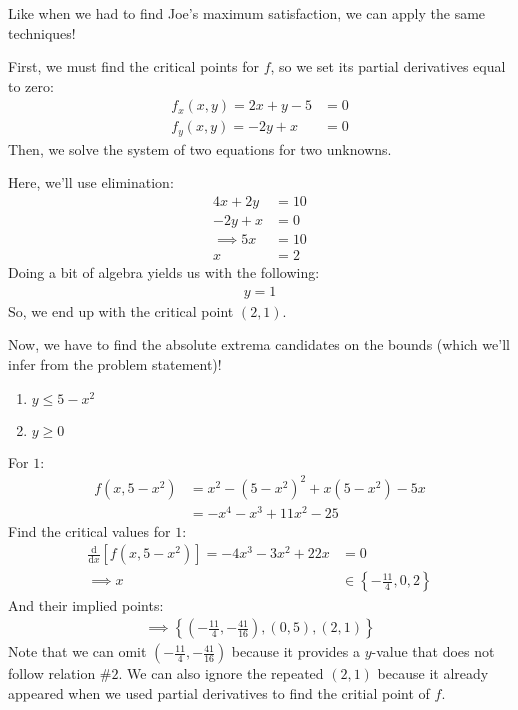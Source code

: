 Like when we had to find Joe's maximum satisfaction, we can apply the same techniques!

First, we must find the critical points for $f$, so we set its partial derivatives equal to zero:
\begin{align*}
	f_x(x,y)=2x+y-5&=0\\
	f_y(x,y)=-2y+x&=0
\end{align*}
Then, we solve the system of two equations for two unknowns.

Here, we'll use elimination:
\begin{align*}
	4x+2y&=10\\
	-2y+x&=0\\
	\implies 5x&=10\\
	x&=2
\end{align*}
Doing a bit of algebra yields us with the following:
\begin{align*}
	y=1
\end{align*}
So, we end up with the critical point $(2, 1)$.

Now, we have to find the absolute extrema candidates on the bounds (which we'll infer from the problem statement)!
\begin{enumerate}
	\item $y\leq 5-x^2$
	\item $y\geq 0$
\end{enumerate}

For $1$:
\begin{align*}
	f(x, 5-x^2) &= x^2-(5-x^2)^2+x(5-x^2)-5x\\
	&= -x^4-x^3+11x^2-25
\end{align*}
Find the critical values for $1$:
\begin{align*}
	\frac{\mathrm{d}}{\mathrm{d}x}[f(x, 5-x^2)] = -4x^3-3x^2+22x&=0\\
	\implies x&\in \left\{-\frac{11}{4}, 0, 2\right\}
\end{align*}
And their implied points:
\begin{align*}
	\implies \left\{\left(-\frac{11}{4}, -\frac{41}{16}\right), (0, 5), (2, 1)\right\}
\end{align*}
Note that we can omit $\left(-\frac{11}{4}, -\frac{41}{16}\right)$ because it provides a $y$-value that does not follow relation \#$2$.
We can also ignore the repeated $(2, 1)$ because it already appeared when we used partial derivatives to find the critial point of $f$.

